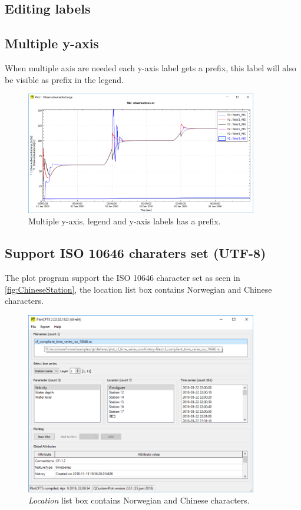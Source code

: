 \documentclass{deltares_memo}
\begin{document}
\subsection{Editing labels}

\subsection{Multiple y-axis}
When multiple axis are needed each y-axis label gets a prefix, this label will also be visible as prefix in the legend.
\begin{figure}[H]
    \centering    
    \includegraphics[width=0.9\textwidth]{pictures/multiple_yaxis.png}
    \caption{Multiple y-axis, legend and y-axis labels has a prefix. \label{fig:multiple y-axis}}
\end{figure}

\subsection{Support ISO 10646 charaters set (UTF-8)}
The plot program support the ISO 10646 character set as seen in \autoref{fig:ChineseStation}, the location list box contains Norwegian and Chinese characters.
\begin{figure}[H]
    \centering    
    \includegraphics[width=0.9\textwidth]{pictures/plotcfts_with_chinese_karakters2.png}
    \caption{\emph{Location} list box contains Norwegian and Chinese characters. \label{fig:ChineseStation}}
\end{figure}
\end{document}
